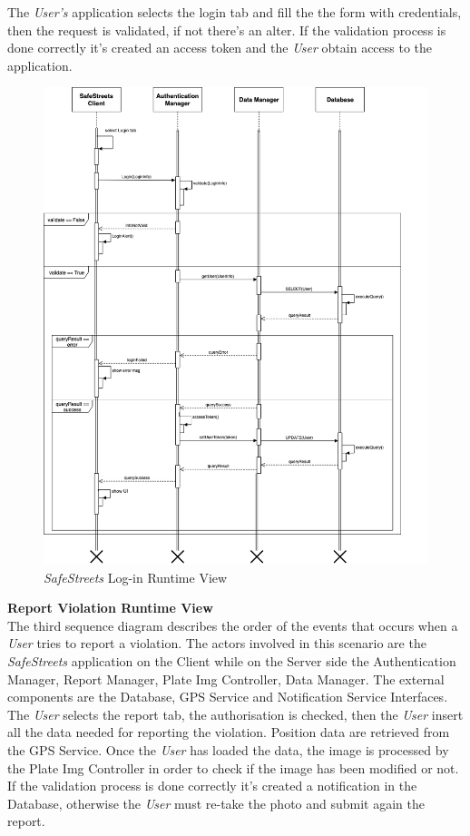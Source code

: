 \documentclass{article}
\begin{document}
	The {\it User's} application selects the login tab and fill the the form with credentials, then the request is validated, if not there's an alter. If the validation process is done correctly it's created an access token and the {\it User} obtain access to the application.
	\begin{figure}[H]
			\centering
			\includegraphics[scale=0.33]{Images/Diagrams/Runtime/login_runtime.png}
			\caption{{\it SafeStreets} Log-in Runtime View}
	\end{figure}
	\pagebreak
	\noindent	
	{\bf Report Violation Runtime View} \\
	The third sequence diagram describes the order of the events that occurs when a {\it User} tries to report a violation. The actors involved in this scenario are the {\it SafeStreets} application on the Client while on the Server side the Authentication Manager, Report Manager, Plate Img Controller, Data Manager. The external components are the Database, GPS Service and Notification Service Interfaces. \\ 
	The {\it User} selects the report tab, the authorisation is checked, then the {\it User} insert all the data needed for reporting the violation. Position data are retrieved from the GPS Service. Once the {\it User} has loaded the data, the image is processed by the Plate Img Controller in order to check if the image has been modified or not. If the validation process is done correctly it's created a notification in the Database, otherwise the {\it User} must re-take the photo and submit again the report.
\end{document}
